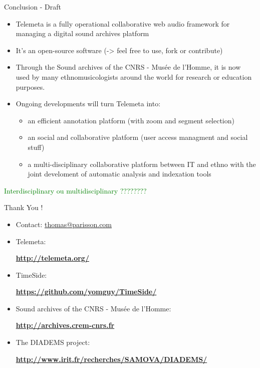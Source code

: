 \documentclass[final, hyperref, table]{beamer}
\begin{document}
\begin{frame}{Conclusion - Draft}
  \begin{itemize}[<+->]
  \item Telemeta is a \alert{fully operational} collaborative web audio framework for managing a digital sound archives platform
  \item It's an \alert{open-source} software (-> feel free to use, fork or contribute)
  \item Through the Sound archives of the CNRS - Musée de
l’Homme, it is now used by many ethnomusicologists around the world for research or education purposes.
  \item Ongoing developments will turn Telemeta into:
    \begin{itemize}\scriptsize
    \item an efficient annotation platform (with zoom and segment selection)
    \item an social and collaborative platform (user access managment and social stuff)
    \item a multi-disciplinary collaborative platform between IT and ethno with the joint develoment of automatic analysis and indexation tools
    \end{itemize}
  \end{itemize}
\textcolor{green}{Interdisciplinary ou multidisciplinary ????????}
\end{frame}
\begin{frame}
  Thank You !\\
  \begin{itemize}
  \item Contact: \url{thomas@parisson.com}
  \item Telemeta:
    \begin{center}
      \colorbox{yellow!40}{\textbf{\url{http://telemeta.org/}}}
    \end{center}

  \item TimeSide:
    \begin{center}
      \colorbox{yellow!40}{\bf
        \url{https://github.com/yomguy/TimeSide/}}
    \end{center}

  \item Sound archives of the CNRS - Musée de l’Homme:
    \begin{center}
      \colorbox{yellow!40}{\bf\url{http://archives.crem-cnrs.fr}}
    \end{center}

  \item The DIADEMS project:
    \begin{center}
      \colorbox{yellow!40}{\bf
        \url{http://www.irit.fr/recherches/SAMOVA/DIADEMS/}}
    \end{center}

  \end{itemize}

\end{frame}
\end{document}
